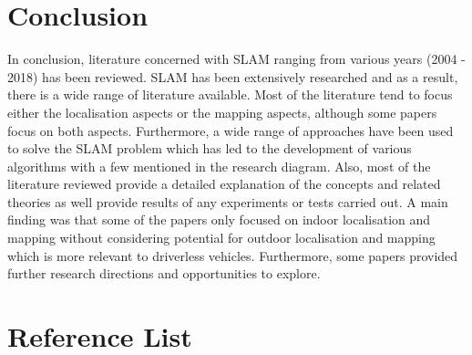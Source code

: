 \documentclass[a4paper, 12pt]{article}
\begin{document}
\newpage
\section{Conclusion}
In conclusion, literature concerned with SLAM ranging from various years (2004 - 2018) has been reviewed. SLAM has been extensively researched and as a result, there is a wide range of literature available. Most of the literature tend to focus either the localisation aspects or the mapping aspects, although some papers focus on both aspects. Furthermore, a wide range of approaches have been used to solve the SLAM problem which has led to the development of various algorithms with a few mentioned in the research diagram. Also, most of the literature reviewed provide a detailed explanation of the concepts and related theories as well provide results of any experiments or tests carried out. A main finding was that some of the papers only focused on indoor localisation and mapping without considering potential for outdoor localisation and mapping which is more relevant to driverless vehicles. Furthermore, some papers provided further research directions and opportunities to explore. 


\newpage
\section{Reference List}
\end{document}
